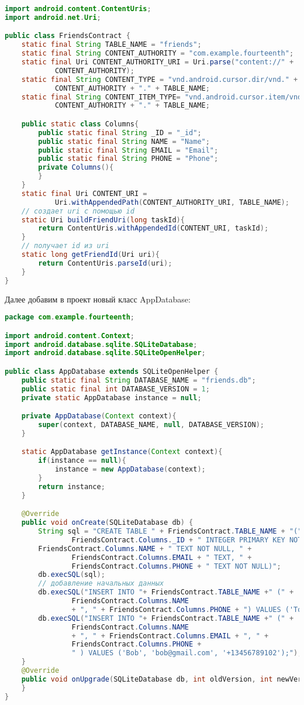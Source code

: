 \begin{lstlisting}[language=Java
	, label=lst:
	]
import android.content.ContentUris;
import android.net.Uri;

public class FriendsContract {
	static final String TABLE_NAME = "friends";
	static final String CONTENT_AUTHORITY = "com.example.fourteenth";
	static final Uri CONTENT_AUTHORITY_URI = Uri.parse("content://" +
			CONTENT_AUTHORITY);
	static final String CONTENT_TYPE = "vnd.android.cursor.dir/vnd." +
			CONTENT_AUTHORITY + "." + TABLE_NAME;
	static final String CONTENT_ITEM_TYPE= "vnd.android.cursor.item/vnd." +
			CONTENT_AUTHORITY + "." + TABLE_NAME;

	public static class Columns{
		public static final String _ID = "_id";
		public static final String NAME = "Name";
		public static final String EMAIL = "Email";
		public static final String PHONE = "Phone";
		private Columns(){
		}
	}
	static final Uri CONTENT_URI =
			Uri.withAppendedPath(CONTENT_AUTHORITY_URI, TABLE_NAME);
	// создает uri с помощью id
	static Uri buildFriendUri(long taskId){
		return ContentUris.withAppendedId(CONTENT_URI, taskId);
	}
	// получает id из uri
	static long getFriendId(Uri uri){
		return ContentUris.parseId(uri);
	}
}
\end{lstlisting}

Далее добавим в проект новый класс AppDatabase:

\begin{lstlisting}[language=Java
	, label=lst:
	]
package com.example.fourteenth;

import android.content.Context;
import android.database.sqlite.SQLiteDatabase;
import android.database.sqlite.SQLiteOpenHelper;

public class AppDatabase extends SQLiteOpenHelper {
	public static final String DATABASE_NAME = "friends.db";
	public static final int DATABASE_VERSION = 1;
	private static AppDatabase instance = null;

	private AppDatabase(Context context){
		super(context, DATABASE_NAME, null, DATABASE_VERSION);
	}

	static AppDatabase getInstance(Context context){
		if(instance == null){
			instance = new AppDatabase(context);
		}
		return instance;
	}

	@Override
	public void onCreate(SQLiteDatabase db) {
		String sql = "CREATE TABLE " + FriendsContract.TABLE_NAME + "(" +
				FriendsContract.Columns._ID + " INTEGER PRIMARY KEY NOT NULL, " +
		FriendsContract.Columns.NAME + " TEXT NOT NULL, " +
				FriendsContract.Columns.EMAIL + " TEXT, " +
				FriendsContract.Columns.PHONE + " TEXT NOT NULL)";
		db.execSQL(sql);
		// добавление начальных данных
		db.execSQL("INSERT INTO "+ FriendsContract.TABLE_NAME +" (" +
				FriendsContract.Columns.NAME
				+ ", " + FriendsContract.Columns.PHONE + ") VALUES ('Tom', '+12345678990');");
		db.execSQL("INSERT INTO "+ FriendsContract.TABLE_NAME +" (" +
				FriendsContract.Columns.NAME
				+ ", " + FriendsContract.Columns.EMAIL + ", " +
				FriendsContract.Columns.PHONE +
				" ) VALUES ('Bob', 'bob@gmail.com', '+13456789102');");
	}
	@Override
	public void onUpgrade(SQLiteDatabase db, int oldVersion, int newVersion) {
	}
}
\end{lstlisting}

